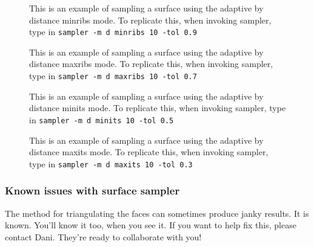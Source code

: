 \begin{figure}[!htb]\centering
     \caption{This is an example of sampling a surface using the adaptive by distance minribs mode. To replicate this, when invoking sampler, type in {\tt sampler -m d minribs 10 -tol 0.9}}
\end{figure}

\begin{figure}[!htb]\centering
     \caption{This is an example of sampling a surface using the adaptive by distance maxribs mode. To replicate this, when invoking sampler, type in {\tt sampler -m d maxribs 10 -tol 0.7}}
\end{figure}


\begin{figure}[!htb]\centering
     \caption{This is an example of sampling a surface using the adaptive by distance minits mode. To replicate this, when invoking sampler, type in {\tt sampler -m d minits 10 -tol 0.5}}
\end{figure}


\begin{figure}[!htb]\centering
     \caption{This is an example of sampling a surface using the adaptive by distance maxits mode. To replicate this, when invoking sampler, type in {\tt sampler -m d maxits 10 -tol 0.3}}
\end{figure}





\subsubsection{Known issues with surface sampler}

The method for triangulating the faces can sometimes produce janky results.  It is known.   You'll know it too, when you see it.  If you want to help fix this, please contact Dani.  They're ready to collaborate with you!

